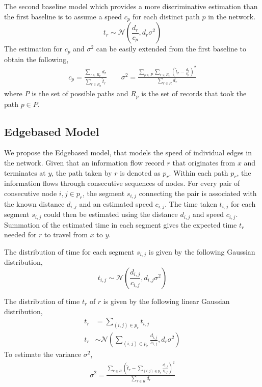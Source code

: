 \documentclass[draft]{sig-alternate}
\begin{document}
The second baseline model which provides a more discriminative estimation than the first baseline is to assume a speed $c_p$ for each distinct path $p$ in the network.
\[ t_r \sim \mathcal{N} \left( \frac{d_r}{c_p}, d_r \sigma^2 \right) \]
The estimation for $c_p$ and $\sigma^2$ can be easily extended from the first baseline to obtain the following,
\begin{gather*}
	c_p = \frac{\sum_{r \in R_p} d_r}{\sum_{r \in R_p} \hat{t}_r} \qquad
    \sigma^2 = \frac{ \sum_{p \in P} \sum_{r \in R_p} \left( \hat{t}_r - \frac{d_r}{c_p} \right)^2 }{ \sum_{r \in R} d_r }
\end{gather*}
where $P$ is the set of possible paths and $R_p$ is the set of records that took the path $p \in P$.

\subsection{Edgebased Model}

We propose the Edgebased model, that models the speed of individual edges in the network. Given that an information flow record $r$ that originates from $x$ and terminates at $y$, the path taken by $r$ is denoted as $p_r$. Within each path $p_r$, the information flows through consecutive sequences of nodes. For every pair of consecutive node $i,j \in p_r$, the segment $s_{i,j}$ connecting the pair is associated with the known distance $d_{i,j}$ and an estimated speed $c_{i,j}$. The time taken $t_{i,j}$ for each segment $s_{i,j}$ could then be estimated using the distance $d_{i,j}$ and speed $c_{i,j}$. Summation of the estimated time in each segment gives the expected time $t_r$ needed for $r$ to travel from $x$ to $y$.

The distribution of time for each segment $s_{i,j}$ is given by the following Gaussian distribution,
\[ t_{i,j} \sim \mathcal{N} \left( \frac{d_{i,j}}{c_{i,j}}, d_{i,j} \sigma^2 \right) \]

The distribution of time $t_r$ of $r$ is given by the following linear Gaussian distribution,
\begin{align*}
	t_r &= \sum_{ (i,j) \in p_r } t_{i,j} \\
	t_r &\sim \mathcal{N} \left( \sum_{ (i,j) \in p_r } \frac{ d_{i,j} }{ c_{i,j} }, d_r \sigma^2 \right)
\end{align*}
To estimate the variance $\sigma^2$,
\begin{align*}
	\sigma^2 = \frac{ \sum_{r \in R} \left( \hat{t}_r - \sum_{ (i,j) \in p_r } \frac{d_{i,j}}{c_{i,j}} \right)^2}{\sum_{r \in R} d_r}
\end{align*}
\end{document}
